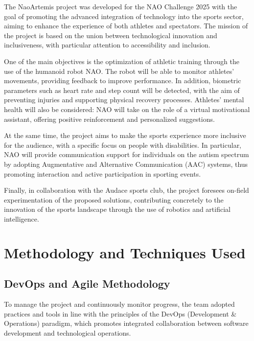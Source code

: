 \documentclass{optica-article}
\begin{document}
\begin{abstract*} 
\vspace{5pt}
\noindent

The NaoArtemis project was developed for the NAO Challenge 2025 with the goal of promoting the advanced integration of technology into the sports sector, aiming to enhance the experience of both athletes and spectators. The mission of the project is based on the union between technological innovation and inclusiveness, with particular attention to accessibility and inclusion.

One of the main objectives is the optimization of athletic training through the use of the humanoid robot NAO. The robot will be able to monitor athletes’ movements, providing feedback to improve performance. In addition, biometric parameters such as heart rate and step count will be detected, with the aim of preventing injuries and supporting physical recovery processes. Athletes’ mental health will also be considered: NAO will take on the role of a virtual motivational assistant, offering positive reinforcement and personalized suggestions.

At the same time, the project aims to make the sports experience more inclusive for the audience, with a specific focus on people with disabilities. In particular, NAO will provide communication support for individuals on the autism spectrum by adopting Augmentative and Alternative Communication (AAC) systems, thus promoting interaction and active participation in sporting events.

Finally, in collaboration with the Audace sports club, the project foresees on-field experimentation of the proposed solutions, contributing concretely to the innovation of the sports landscape through the use of robotics and artificial intelligence.
\vspace{5pt}
\section{Methodology and Techniques Used}

\subsection{DevOps and Agile Methodology}
To manage the project and continuously monitor progress, the team adopted practices and tools in line with the principles of the DevOps (Development \& Operations) paradigm, which promotes integrated collaboration between software development and technological operations.


\end{abstract*}
\end{document}
